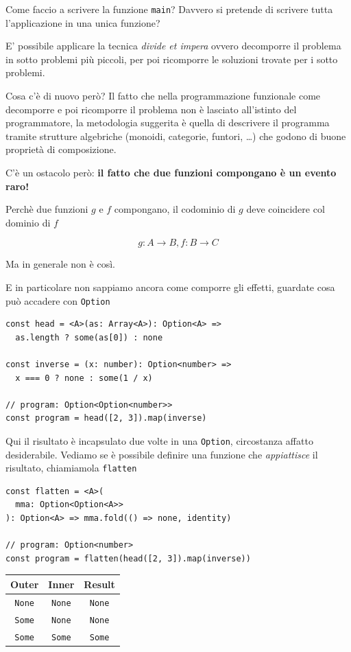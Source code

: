 \documentclass[12pt]{article}
\begin{document}
Come faccio a scrivere la funzione \texttt{main}? Davvero si pretende di scrivere tutta l'applicazione in una unica funzione?

E' possibile applicare la tecnica \emph{divide et impera} ovvero decomporre il problema in sotto problemi più piccoli,
per poi ricomporre le soluzioni trovate per i sotto problemi.

Cosa c'è di nuovo però? Il fatto che nella programmazione funzionale come decomporre e poi ricomporre il problema non è lasciato
all'istinto del programmatore, la metodologia suggerita è quella di descrivere il programma tramite strutture algebriche
(monoidi, categorie, funtori, \ldots) che godono di buone proprietà di composizione.

C'è un ostacolo però: \textbf{il fatto che due funzioni compongano è un evento raro!}

Perchè due funzioni $g$ e $f$ compongano, il codominio di $g$ deve coincidere col dominio di $f$

$$
g: A \rightarrow B, f: B \rightarrow C
$$

Ma in generale non è così.

E in particolare non sappiamo ancora come comporre gli effetti, guardate cosa può accadere con \texttt{Option}

\begin{verbatim}
const head = <A>(as: Array<A>): Option<A> =>
  as.length ? some(as[0]) : none

const inverse = (x: number): Option<number> =>
  x === 0 ? none : some(1 / x)

// program: Option<Option<number>>
const program = head([2, 3]).map(inverse)
\end{verbatim}

Qui il risultato è incapsulato due volte in una \texttt{Option}, circostanza affatto desiderabile.
Vediamo se è possibile definire una funzione che \emph{appiattisce} il risultato, chiamiamola \texttt{flatten}

\begin{verbatim}
const flatten = <A>(
  mma: Option<Option<A>>
): Option<A> => mma.fold(() => none, identity)

// program: Option<number>
const program = flatten(head([2, 3]).map(inverse))
\end{verbatim}

\begin{center}
\begin{tabular}{ c c c }
 Outer & Inner & Result \\
 \hline
 \texttt{None} & \texttt{None} & \texttt{None} \\
 \texttt{Some} & \texttt{None} & \texttt{None} \\
 \texttt{Some} & \texttt{Some} & \texttt{Some}
\end{tabular}
\end{center}
\end{document}
